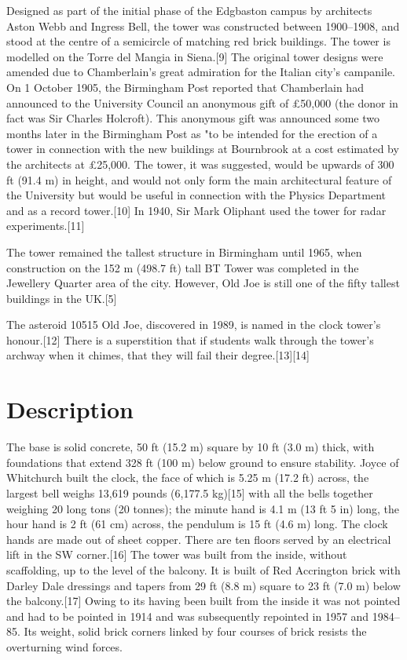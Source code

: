 Designed as part of the initial phase of the Edgbaston campus by architects Aston Webb and Ingress Bell, the tower was constructed between 1900–1908, and stood at the centre of a semicircle of matching red brick buildings. The tower is modelled on the Torre del Mangia in Siena.[9] The original tower designs were amended due to Chamberlain's great admiration for the Italian city's campanile. On 1 October 1905, the Birmingham Post reported that Chamberlain had announced to the University Council an anonymous gift of £50,000 (the donor in fact was Sir Charles Holcroft). This anonymous gift was announced some two months later in the Birmingham Post as "to be intended for the erection of a tower in connection with the new buildings at Bournbrook at a cost estimated by the architects at £25,000. The tower, it was suggested, would be upwards of 300 ft (91.4 m) in height, and would not only form the main architectural feature of the University but would be useful in connection with the Physics Department and as a record tower.[10] In 1940, Sir Mark Oliphant used the tower for radar experiments.[11]

The tower remained the tallest structure in Birmingham until 1965, when construction on the 152 m (498.7 ft) tall BT Tower was completed in the Jewellery Quarter area of the city. However, Old Joe is still one of the fifty tallest buildings in the UK.[5]

The asteroid 10515 Old Joe, discovered in 1989, is named in the clock tower's honour.[12] There is a superstition that if students walk through the tower's archway when it chimes, that they will fail their degree.[13][14] 

\section{Description}

The base is solid concrete, 50 ft (15.2 m) square by 10 ft (3.0 m) thick, with foundations that extend 328 ft (100 m) below ground to ensure stability. Joyce of Whitchurch built the clock, the face of which is 5.25 m (17.2 ft) across, the largest bell weighs 13,619 pounds (6,177.5 kg)[15] with all the bells together weighing 20 long tons (20 tonnes); the minute hand is 4.1 m (13 ft 5 in) long, the hour hand is 2 ft (61 cm) across, the pendulum is 15 ft (4.6 m) long. The clock hands are made out of sheet copper. There are ten floors served by an electrical lift in the SW corner.[16] The tower was built from the inside, without scaffolding, up to the level of the balcony. It is built of Red Accrington brick with Darley Dale dressings and tapers from 29 ft (8.8 m) square to 23 ft (7.0 m) below the balcony.[17] Owing to its having been built from the inside it was not pointed and had to be pointed in 1914 and was subsequently repointed in 1957 and 1984–85. Its weight, solid brick corners linked by four courses of brick resists the overturning wind forces.

